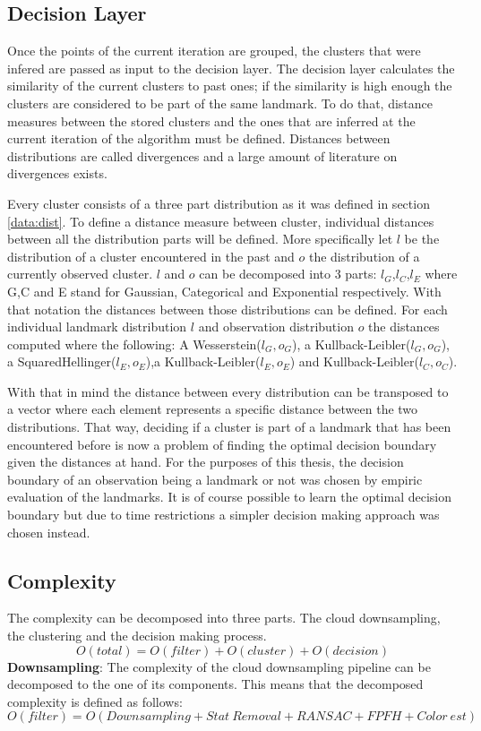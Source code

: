 \documentclass[twoside,hidelinks]{article}
\begin{document}
\subsection{Decision Layer}

Once the points of the current iteration are grouped, the clusters that were infered are passed as input to the decision layer. The decision layer calculates the similarity of the current clusters to past ones; if the similarity is high enough the clusters are considered to be part of the same landmark. To do that, distance measures between the stored clusters and the ones that are inferred at the current iteration of the algorithm must be defined. Distances between distributions are called divergences and a large amount of literature on divergences exists.

Every cluster consists of a three part distribution as it was defined in section \ref{data:dist}. To define a distance measure between cluster, individual distances between all the distribution parts will be defined. More specifically let $l$ be the distribution of a cluster encountered in the past and $o$ the distribution of a currently observed cluster. $l$ and $o$ can be decomposed into 3 parts: $l_G$,$l_C$,$l_E$ where G,C and E stand for Gaussian, Categorical and Exponential respectively. With that notation the distances between those distributions can be defined. For each individual landmark distribution $l$ and observation distribution $o$ the distances computed where the following: A Wesserstein($l_G,o_G$), a Kullback-Leibler($l_G,o_G$), a SquaredHellinger($l_E,o_E$),a Kullback-Leibler($l_E,o_E$) and  Kullback-Leibler($l_C,o_C$).

With that in mind the distance between every distribution can be transposed to a vector where each element represents a specific distance between the two distributions. That way, deciding if a cluster is part of a landmark that has been encountered before is now a problem of finding the optimal decision boundary given the distances at hand. For the purposes of this thesis, the decision boundary of an observation being a landmark or not was chosen by empiric evaluation of the landmarks. It is of course possible to learn the optimal decision boundary but due to time restrictions a simpler decision making approach was chosen instead.

\subsection{Complexity}
\label{subsec:complexity}
The complexity can be decomposed into three parts. The cloud downsampling, the clustering and the decision making process.
$$
O(total) = O(filter) + O(cluster) + O(decision)
$$
\textbf{Downsampling}: The complexity of the cloud downsampling pipeline can be decomposed to the one of its components. This means that the decomposed complexity is defined as follows:
$$O(filter) = O(Downsampling + Stat\ Removal + RANSAC+ FPFH + Color\ est) $$
\end{document}
